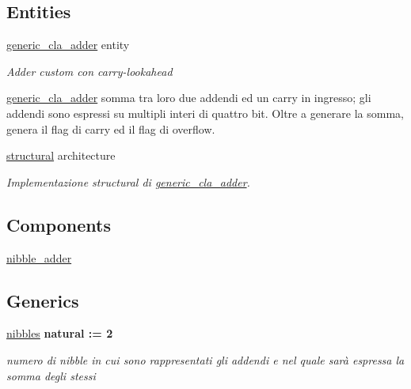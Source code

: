 \subsection*{Entities}
\begin{DoxyCompactItemize}
\item 
\hyperlink{classgeneric__cla__adder}{generic\+\_\+cla\+\_\+adder} entity
\begin{DoxyCompactList}\small\item\em Adder custom con carry-\/lookahead

\hyperlink{classgeneric__cla__adder}{generic\+\_\+cla\+\_\+adder} somma tra loro due addendi ed un carry in ingresso; gli addendi sono espressi su multipli interi di quattro bit. Oltre a generare la somma, genera il flag di carry ed il flag di overflow. \end{DoxyCompactList}\item 
\hyperlink{classgeneric__cla__adder_1_1structural}{structural} architecture
\begin{DoxyCompactList}\small\item\em Implementazione structural di \hyperlink{classgeneric__cla__adder}{generic\+\_\+cla\+\_\+adder}. \end{DoxyCompactList}\end{DoxyCompactItemize}
\subsection*{Components}
 \begin{DoxyCompactItemize}
\item 
\hyperlink{group___carry_loockahead_ga98a3a5b152caf0f2de1e31ac60088369}{nibble\+\_\+adder}  {\bfseries }  
\end{DoxyCompactItemize}
\subsection*{Generics}
 \begin{DoxyCompactItemize}
\item 
\hyperlink{group___carry_loockahead_ga0b63b586531492d0fa882246cca071c1}{nibbles} {\bfseries {\bfseries \textcolor{vhdlchar}{natural}\textcolor{vhdlchar}{ }\textcolor{vhdlchar}{ }\textcolor{vhdlchar}{\+:}\textcolor{vhdlchar}{=}\textcolor{vhdlchar}{ }\textcolor{vhdlchar}{ } \textcolor{vhdldigit}{2} \textcolor{vhdlchar}{ }}}
\begin{DoxyCompactList}\small\item\em numero di nibble in cui sono rappresentati gli addendi e nel quale sarà espressa la somma degli stessi \end{DoxyCompactList}\end{DoxyCompactItemize}
